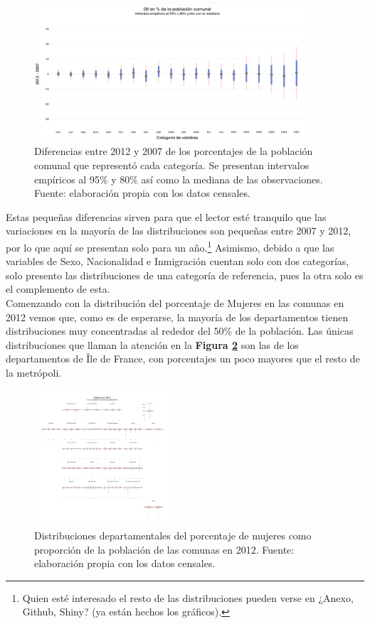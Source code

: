 \begin{figure}[h]
	\centering
	\includegraphics[width = 0.9\textwidth]{Figs/AED/Cambio_Pct_Comunal_Cat}
	\caption{Diferencias entre 2012 y 2007 de los porcentajes de la población comunal que representó cada categoría. Se presentan intervalos empíricos al 95\% y 80\% así como la mediana de las observaciones. Fuente: elaboración propia con los datos censales.}
	\label{fig:Dif_Pct_Cat}	
\end{figure}

Estas pequeñas diferencias sirven para que el lector esté tranquilo que las variaciones en la mayoría de las distribuciones son pequeñas entre 2007 y 2012, por lo que aquí se presentan solo para un año.\footnote{Quien esté interesado el resto de las distribuciones pueden verse en {\color{red} ¿Anexo, Github, Shiny?} (ya están hechos los gráficos).} Asimismo, debido a que las variables de Sexo, Nacionalidad e Inmigración cuentan solo con dos categorías, solo presento las distribuciones de una categoría de referencia, pues la otra solo es el complemento de esta.\\

Comenzando con la distribución del porcentaje de Mujeres en las comunas en 2012 vemos que, como es de esperarse, la mayoría de los departamentos tienen distribuciones muy concentradas al rededor del 50\% de la población. Las únicas distribuciones que llaman la atención en la \textbf{Figura \ref{fig:Distr_por_Dpto_Muj_2012}} son las de los departamentos de Île de France, con porcentajes un poco mayores que el resto de la metrópoli.\\ 

\begin{figure}[h]
	\centering
	\includegraphics[width = 0.45\textwidth]{Figs/AED/Geofacet_Distr_por_Dpto_Muj_2012}
	\caption{Distribuciones departamentales del porcentaje de mujeres como proporción de la población de las comunas en 2012. Fuente: elaboración propia con los datos censales.}
	\label{fig:Distr_por_Dpto_Muj_2012}	
\end{figure}

